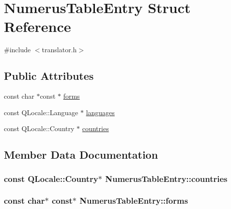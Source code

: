 \hypertarget{structNumerusTableEntry}{}\section{Numerus\+Table\+Entry Struct Reference}
\label{structNumerusTableEntry}


{\ttfamily \#include $<$translator.\+h$>$}

\subsection*{Public Attributes}
\begin{DoxyCompactItemize}
\item 
const char $\ast$const $\ast$ \hyperlink{structNumerusTableEntry_a68437fa4ac7eb72bff7e17b3b69599db}{forms}
\item 
const Q\+Locale\+::\+Language $\ast$ \hyperlink{structNumerusTableEntry_ae064718eb2615e2b0930b18821ffbb3a}{languages}
\item 
const Q\+Locale\+::\+Country $\ast$ \hyperlink{structNumerusTableEntry_a31131fd3dc5f2367f0ef7deb3fb52f5e}{countries}
\end{DoxyCompactItemize}


\subsection{Member Data Documentation}
\hypertarget{structNumerusTableEntry_a31131fd3dc5f2367f0ef7deb3fb52f5e}{}
\subsubsection[{countries}]{\setlength{\rightskip}{0pt plus 5cm}const Q\+Locale\+::\+Country$\ast$ Numerus\+Table\+Entry\+::countries}\label{structNumerusTableEntry_a31131fd3dc5f2367f0ef7deb3fb52f5e}
\hypertarget{structNumerusTableEntry_a68437fa4ac7eb72bff7e17b3b69599db}{}
\subsubsection[{forms}]{\setlength{\rightskip}{0pt plus 5cm}const char$\ast$ const$\ast$ Numerus\+Table\+Entry\+::forms}\label{structNumerusTableEntry_a68437fa4ac7eb72bff7e17b3b69599db}
\hypertarget{structNumerusTableEntry_ae064718eb2615e2b0930b18821ffbb3a}{}
